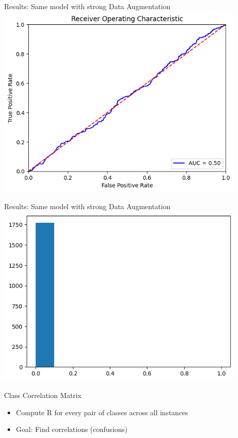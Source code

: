 \begin{frame}{Results: Same model with strong Data Augmentation}
    \centering
    \includegraphics[height=0.9\textheight,width=0.9\textwidth,keepaspectratio]{images/ROC_Curve_DA.png}
\end{frame}

\begin{frame}{Results: Same model with strong Data Augmentation}
    \centering
    \includegraphics[height=0.9\textheight,width=0.9\textwidth,keepaspectratio]{images/distribution_DA.png}
\end{frame}

\begin{frame}{Class Correlation Matrix}
    \begin{itemize}
        \item Compute R for every pair of classes across all instances
        \item Goal: Find correlations (confusions)
    \end{itemize}
\end{frame}

